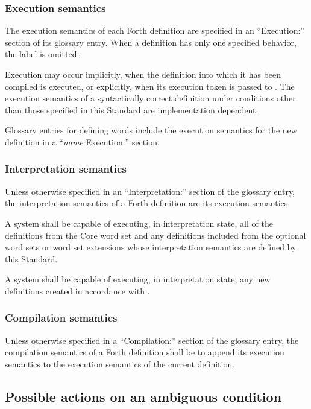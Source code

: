 \subsubsection{Execution semantics} %

The execution semantics of each Forth definition are specified in an
``\textsf{Execution:}'' section of its glossary entry. When a
definition has only one specified behavior, the label is omitted.

Execution may occur implicitly, when the definition into which it
has been compiled is executed, or explicitly, when its execution
token is passed to . The execution semantics of a
syntactically correct definition under conditions other than those
specified in this Standard are implementation dependent.

Glossary entries for defining words include the execution semantics
for the new definition in a ``\emph{name} \textsf{Execution:}''
section.

\subsubsection{Interpretation semantics} %
\label{usage:interpret}

Unless otherwise specified in an ``\textsf{Interpretation:}''
section of the glossary entry, the interpretation semantics of a
Forth definition are its execution semantics.

A system shall be capable of executing, in interpretation state,
all of the definitions from the Core word set and any definitions
included from the optional word sets or word set extensions whose
interpretation semantics are defined by this Standard.

A system shall be capable of executing, in interpretation state,
any new definitions created in accordance with
.

\subsubsection{Compilation semantics} %
\label{usage:compile}

Unless otherwise specified in a ``\textsf{Compilation:}'' section
of the glossary entry, the compilation semantics of a Forth
definition shall be to append its execution semantics to the
execution semantics of the current definition.


\subsection{Possible actions on an ambiguous condition} %
\label{usage:ambiguous}

